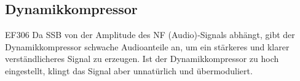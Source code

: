 \begin{ohmchapter}
\end{ohmchapter}  

\subsection{Dynamikkompressor}

\begin{sol}{EF306}
  Da SSB von der Amplitude des NF (Audio)‑Signals abhängt, gibt der Dynamikkompressor schwache Audioanteile an, um ein stärkeres und klarer verständlicheres Signal zu erzeugen. Ist der Dynamikkompressor zu hoch eingestellt, klingt das Signal aber unnatürlich und übermoduliert.
\end{sol} 
\begin{ohmchapter}
\end{ohmchapter}  

